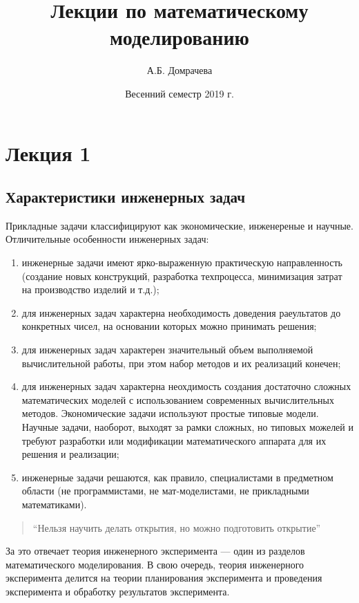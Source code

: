 \documentclass[12pt]{article}
\title{Лекции по математическому моделированию}
\author{А.Б. Домрачева}
\date{Весенний семестр 2019 г.}
\begin{document}
\maketitle
\thispagestyle{empty}

\newpage
\tableofcontents
\thispagestyle{empty}

\newpage
\section{Лекция 1}
\subsection{Характеристики инженерных задач}
Прикладные задачи классифицируют как экономические, инженереные и научные. Отличительные особенности инженерных задач:

\begin{enumerate}
    \item инженерные задачи имеют ярко-выраженную практическую направленность (создание новых конструкций, разработка техпроцесса, минимизация затрат на производство изделий и т.д.);
    \item для инженерных задач характерна необходимость доведения раеультатов до конкретных чисел, на основании которых можно принимать решения;
    \item для инженерных задач характерен значительный объем выполняемой вычислительной работы, при этом набор методов и их реализаций конечен;
    \item для инженерных задач характерна неохдимость создания достаточно сложных математических моделей с использованием современных вычислительных методов. Экономические задачи используют простые типовые модели. Научные задачи, наоборот, выходят за рамки сложных, но типовых можелей и требуют разработки или модификации математического аппарата для их решения и реализации;
    \item инженерные задачи решаются, как правило, специалистами в предметном области (не программистами, не мат-моделистами, не прикладными математиками).
\end{enumerate}

\begin{quotation}
    \enquote{Нельзя научить делать открытия, но можно подготовить открытие}
\end{quotation}

За это отвечает теория инженерного эксперимента --- один из разделов математического моделирования. В свою очередь, теория инженерного эксперимента делится на теории планирования эксперимента и проведения эксперимента и обработку результатов эксперимента.
\end{document}
